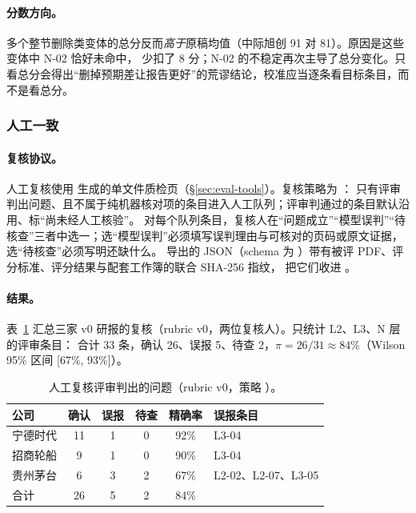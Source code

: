 \paragraph{分数方向。}
多个整节删除类变体的总分反而\emph{高于}原稿均值（中际旭创  91 对 81）。原因是这些变体中 N-02 恰好未命中，
少扣了 8 分；N-02 的不稳定再次主导了总分变化。只看总分会得出“删掉预期差让报告更好”的荒谬结论，校准应当逐条看目标条目，而不是看总分。

\subsubsection{人工一致}
\label{sec:eval-calib-human}

\paragraph{复核协议。}
\begin{sloppypar}
人工复核使用  生成的单文件质检页（\S\ref{sec:eval-tools}）。复核策略为 ：
只有评审判出问题、且不属于纯机器核对项的条目进入人工队列；评审判通过的条目默认沿用、标“尚未经人工核验”。
对每个队列条目，复核人在“问题成立”“模型误判”“待核查”三者中选一；选“模型误判”必须填写误判理由与可核对的页码或原文证据，选“待核查”必须写明还缺什么。
导出的 JSON（schema 为
）带有被评 PDF、评分标准、评分结果与配套工作簿的联合 SHA-256 指纹，
 把它们收进 。
\end{sloppypar}

\paragraph{结果。}
表~\ref{tab:eval-human} 汇总三家 v0 研报的复核（rubric v0，两位复核人）。只统计 L2、L3、N 层的评审条目：
合计 33 条，确认 26、误报 5、待查 2，$\pi=26/31\approx 84\%$（Wilson 95\% 区间 [67\%, 93\%]）。

\begin{table}[t]
\centering
\caption{人工复核评审判出的问题（rubric v0，策略 ）。}
\label{tab:eval-human}
\small
\begin{tabular}{@{}l c c c c l@{}}
\toprule
公司 & 确认 & 误报 & 待查 & 精确率 & 误报条目 \\
\midrule
宁德时代 & 11 & 1 & 0 & 92\% & L3-04 \\
招商轮船 & 9 & 1 & 0 & 90\% & L3-04 \\
贵州茅台 & 6 & 3 & 2 & 67\% & L2-02、L2-07、L3-05 \\
\midrule
合计 & 26 & 5 & 2 & 84\% & \\
\bottomrule
\end{tabular}
\end{table}

